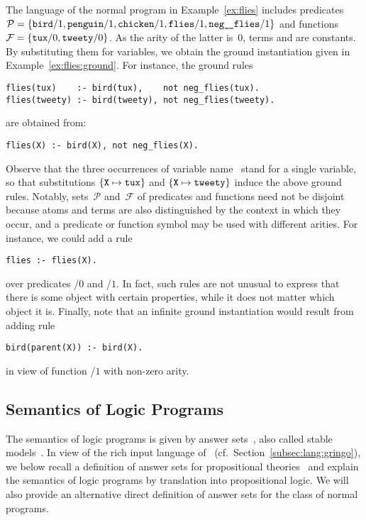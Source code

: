 \begin{example}\label{ex:syntax}
The language of the normal program in Example~\ref{ex:flies} includes
predicates
\(
\mathcal{P}=
\{
\texttt{bird}/1,\texttt{penguin}/1,\texttt{chicken}/1,
\texttt{flies}/1,\texttt{neg\_\hspace{-0.7pt}\_flies}/1\}
\)
and functions
\(
\mathcal{F}=
\{
\texttt{tux}/0,\texttt{tweety}/0
\}
\).
As the arity of the latter is~$0$,
terms  and  are constants.
By substituting them for variables,
we obtain the ground instantiation given in Example~\ref{ex:flies:ground}.
For instance, the ground rules
%
\begin{lstlisting}[numbers=none]
flies(tux)    :- bird(tux),    not neg_flies(tux).
flies(tweety) :- bird(tweety), not neg_flies(tweety).
\end{lstlisting}
%
are obtained from:
%
\begin{lstlisting}[numbers=none]
flies(X) :- bird(X), not neg_flies(X).
\end{lstlisting}
%
Observe that the three occurrences of variable name~
stand for a single variable, so that substitutions
$\{\texttt{X}\mapsto\texttt{tux}\}$ and $\{\texttt{X}\mapsto\texttt{tweety}\}$
induce the above ground rules.
Notably, sets~$\mathcal{P}$ and~$\mathcal{F}$ of predicates and functions
need not be disjoint because atoms and terms are also distinguished
by the context in which they occur,
and a predicate or function symbol may be used with different arities.
For instance, we could add a rule
%
\begin{lstlisting}[numbers=none]
flies :- flies(X).
\end{lstlisting}
%
over predicates /$0$ and /$1$. 
In fact, such rules are not unusual to express that there is some object
with certain properties, while it does not matter which object it is.
Finally, note that an infinite ground instantiation would result from adding rule
\begin{lstlisting}[numbers=none]
bird(parent(X)) :- bird(X).
\end{lstlisting}
in view of function /$1$ with non-zero arity.
\eexample
\end{example}


\subsection{Semantics of Logic Programs}\label{subsec:semantics}

The semantics of logic programs is given by answer sets~\cite{gellif91a},
also called stable models~\cite{gellif88a}.
In view of the rich input language of \gringo\ (cf.\ Section~\ref{subsec:lang:gringo}),
we below recall a definition of answer sets
for propositional theories~\cite{ferraris05a} and
explain the semantics of logic programs by translation
into propositional logic.
We will also provide an alternative direct definition of answer sets
for the class of normal programs.

